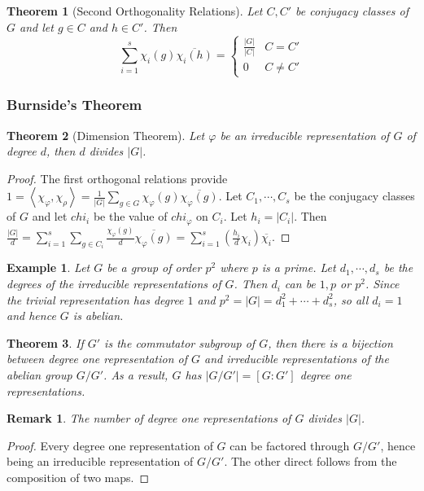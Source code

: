 \documentclass{article}
\newtheorem{Thm}{Theorem}[section]
\newtheorem{Eg}{Example}[section]
\newtheorem*{Rk}{Remark}
\theoremstyle{definition}
\begin{document}
\begin{Thm}[Second Orthogonality Relations]
    Let $C,C'$ be conjugacy classes of $G$ and let $g\in C$ and $h\in C'$. Then \[\sum_{i=1}^s\chi_i(g)\overline{\chi_i(h)}=\left\{\begin{matrix}
        \frac{\left|G\right |}{\left|C\right |}  & C=C'\\
        0 & C\ne C'
       \end{matrix}\right.\]
\end{Thm}


\subsubsection{Burnside's Theorem}
\begin{Thm}[Dimension Theorem]
    Let $\varphi$ be an irreducible representation of $G$ of degree $d$, then $d$ divides $\left|G\right|$.
\end{Thm}
\begin{proof}
    The first orthogonal relations provide $1=\left\langle\chi_\varphi,\chi_\rho\right\rangle=\frac{1}{\left|G\right|}\sum_{g\in G}\chi_\varphi(g)\overline{\chi_\varphi(g)}$.
Let $C_1,\cdots,C_s$ be the conjugacy classes of $G$ and let $chi_i$ be the value of $chi_\varphi$ on $C_i$. Let $h_i=\left|C_i\right|$.
Then $\frac{\left|G\right|}{d}=\sum_{i=1}^s\sum_{g\in C_i}\frac{\chi_\varphi(g)}{d}\overline{\chi_\varphi(g)}=\sum_{i=1}^s(\frac{h_i}{d}\chi_i)\overline{\chi_i}$.
\end{proof}

\begin{Eg}
    Let $G$ be a group of order $p^2$ where $p$ is a prime. Let $d_1,\cdots,d_s$ be the degrees of the irreducible representations of $G$.
    Then $d_i$ can be $1,p$ or $p^2$. Since the trivial representation has degree $1$ and $p^2=\left|G\right|=d_1^2+\cdots+d_s^2$, so all $d_i=1$ and hence $G$ is abelian.
\end{Eg}

\begin{Thm}
    If $G'$ is the commutator subgroup of $G$, then there is a bijection between degree one representation of $G$ and irreducible representations of the abelian group $G/G'$.
As a result, $G$ has $\left|G/G'\right|=[G:G']$ degree one representations.
\end{Thm}
\begin{Rk}
    The number of degree one representations of $G$ divides $\left|G\right|$.
\end{Rk}
\begin{proof}
    Every degree one representation of $G$ can be factored through $G/G'$, hence being an irreducible representation of $G/G'$. The other direct follows from the composition of two maps.
\end{proof}
\end{document}
